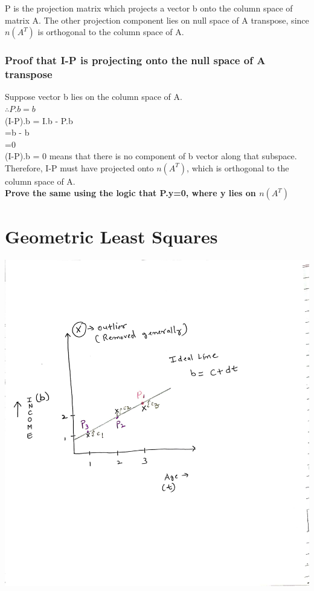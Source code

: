 \documentclass[]{article}
\begin{document}
P is the projection matrix which projects a vector b onto the column space of matrix A. The other projection component lies on null space of A transpose, since $n(A^T)$ is orthogonal to the column space of A.
\vspace{10pt}
\subsubsection{Proof that I-P is projecting onto the null space of A transpose}
\vspace{10pt}
Suppose vector b lies on the column space of A.\\

\noindent
$\therefore P.b=b$\\

\noindent
(I-P).b = I.b - P.b\\
=b - b\\
=0\\

\noindent
(I-P).b = 0 means that there is no component of b vector along that subspace. Therefore, I-P must have projected onto $n(A^T)$, which is orthogonal to the column space of A.\\

\textbf{Prove the same using the logic that P.y=0, where y lies on $n(A^T)$}

\vspace{10pt}

\section{Geometric Least Squares}
\vspace{10pt}
\begin{center}
	\includegraphics[scale=.18]{least_squares}
\end{center}
\vspace{10pt}
\end{document}
